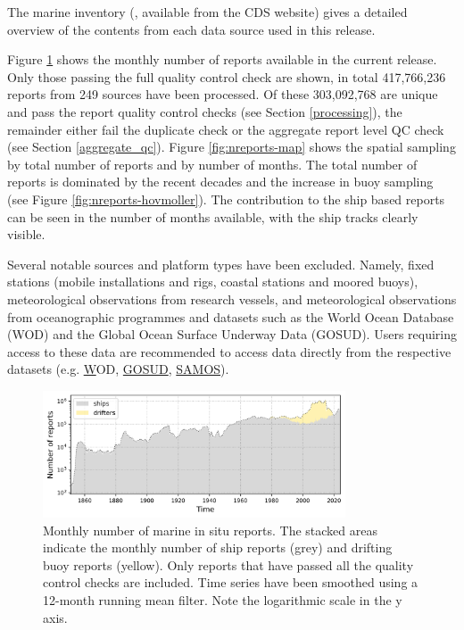 The marine inventory (\inventoryref{}, available from the CDS website) gives a detailed overview of the contents from each data source used in this release.

Figure \ref{fig:nreports-ts} shows the monthly number of reports available in the current release. 
Only those passing the full quality control check are shown, in total 417,766,236 reports from 249 sources have been processed.
Of these 303,092,768 are unique and pass the report quality control checks (see Section \ref{processing}), the remainder either fail the duplicate check or the aggregate report level QC check (see Section \ref{aggregate_qc}).
Figure \ref{fig:nreports-map} shows the spatial sampling by total number of reports and by number of months. 
The total number of reports is dominated by the recent decades and the increase in buoy sampling (see Figure \ref{fig:nreports-hovmoller}). 
The contribution to the ship based reports can be seen in the number of months available, with the ship tracks clearly visible.

Several notable sources and platform types have been excluded.
Namely, fixed stations (mobile installations and rigs, coastal stations and moored buoys), meteorological observations from research vessels, and meteorological observations from oceanographic programmes and datasets such as the World Ocean Database (WOD) and the Global Ocean Surface Underway Data (GOSUD). 
Users requiring access to these data are recommended to access data directly from the respective datasets (e.g. \href{https://www.ncei.noaa.gov/access/world-ocean-database-select/dbsearch.html} WOD, \href{http://www.gosud.org/}{GOSUD}, \href{https://samos.coaps.fsu.edu/html/nav.php?s=2}{SAMOS}).

\begin{figure} [h]
    \centering
    \includegraphics[width=0.8\textwidth]{resources/nreports-ts.png}
    \caption{Monthly number of marine in situ reports. The stacked areas indicate the monthly number of ship reports (grey) and drifting buoy reports (yellow). Only reports that have passed all the quality control checks are included. Time series have been smoothed using a 12-month running mean filter. Note the logarithmic scale in the y axis.\\}
    \label{fig:nreports-ts}
\end{figure}

